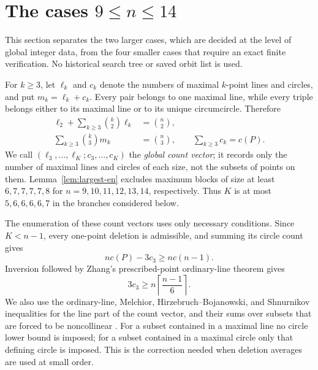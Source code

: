 \section{The cases \texorpdfstring{$9\le n\le14$}{9<=n<=14}}
\label{sec:small-uniform-en}

This section separates the two larger cases, which are decided at the level of
global integer data, from the four smaller cases that require an exact finite
verification.  No historical search tree or saved orbit list is used.

For $k\ge3$, let $\ell_k$ and $c_k$ denote the numbers of maximal $k$-point
lines and circles, and put $m_k=\ell_k+c_k$.
Every pair belongs to one maximal
line, while every triple belongs either to its maximal line or to its unique
circumcircle.  Therefore
\begin{align}
 \ell_2+\sum_{k\ge3}\binom{k}{2}\ell_k&=\binom n2,
 \label{eq:small-line-pairs-en}\\
 \sum_{k\ge3}\binom{k}{3}m_k&=\binom n3,
 \qquad \sum_{k\ge3}c_k=c(P).
 \label{eq:small-triple-partition-en}
\end{align}
We call $(\ell_3,\ldots,\ell_K;c_3,\ldots,c_K)$ the \emph{global count
vector}; it records only the number of maximal lines and circles of each size,
not the subsets of points on them.  Lemma~\ref{lem:largest-en} excludes maximum blocks of size at
least $6,7,7,7,7,8$ for $n=9,10,11,12,13,14$, respectively.  Thus $K$ is at
most $5,6,6,6,6,7$ in the branches considered below.

The enumeration of these count vectors uses only necessary conditions.  Since $K<n-1$,
every one-point deletion is admissible, and summing its circle count gives
\begin{equation}\label{eq:small-one-delete-en}
 n c(P)-3c_3\ge n c(n-1).
\end{equation}
Inversion followed by Zhang's prescribed-point ordinary-line theorem
\cite[Theorem~4.1]{zhang-en} gives
\begin{equation}\label{eq:small-z-circle-en}
 3c_3\ge n\left\lceil\frac{n-1}{6}\right\rceil.
\end{equation}
We also use the ordinary-line, Melchior, Hirzebruch--Bojanowski, and
Shnurnikov inequalities for the line part of the count vector, and their sums
over subsets that are forced to be noncollinear
\cite[Eq.~(9)]{hirzebruch-en}
\cite[Theorem~2.1]{pokora-en}\cite[Theorem~3]{shnurnikov-en}.
For a subset contained in a maximal line no circle lower bound is imposed; for
a subset contained in a maximal circle only that defining circle is imposed.
This is the correction needed when deletion averages are used at small order.

